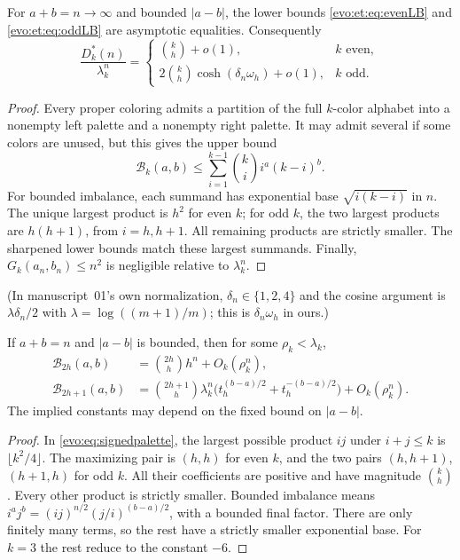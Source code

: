 \documentclass[11pt,a4paper]{article}
\numberwithin{equation}{section}
\theoremstyle{definition}
\theoremstyle{remark}
\newcommand{\Bip}{\mathcal B}
\begin{document}
\begin{lemma}\label{evo:et:lem:witnessasym}
For $a+b=n\to\infty$ and bounded $|a-b|$, the lower bounds
\eqref{evo:et:eq:evenLB} and \eqref{evo:et:eq:oddLB} are asymptotic
equalities. Consequently
\begin{equation}\label{evo:et:eq:witnessasym}
 \frac{D^*_k(n)}{\lambda_k^n}=
 \begin{cases}
 \binom kh+o(1),&k\text{ even},\\
 2\binom kh\cosh(\delta_n\omega_h)+o(1),&k\text{ odd}.
 \end{cases}
\end{equation}
\end{lemma}
\begin{proof}
Every proper coloring admits a partition of the full $k$-color alphabet into a
nonempty left palette and a nonempty right palette. It may admit several if
some colors are unused, but this gives the upper bound
\begin{equation}\label{evo:et:eq:paletteUB}
 \Bip_k(a,b)\le\sum_{i=1}^{k-1}\binom ki i^a(k-i)^b.
\end{equation}
For bounded imbalance, each summand has exponential base $\sqrt{i(k-i)}$ in
$n$. The unique largest product is $h^2$ for even $k$; for odd $k$, the two
largest products are $h(h+1)$, from $i=h,h+1$. All remaining products are
strictly smaller. The sharpened lower bounds match these largest summands.
Finally, $G_k(a_n,b_n)\le n^2$ is negligible relative to $\lambda_k^n$.
\end{proof}

(In manuscript~01's own normalization, $\delta_n\in\{1,2,4\}$ and the cosine
argument is $\lambda\delta_n/2$ with $\lambda=\log((m+1)/m)$; this is
$\delta_n\omega_h$ in ours.)

\begin{lemma}\label{evo:da:lem:balancedasymp}
If $a+b=n$ and $|a-b|$ is bounded, then for some $\rho_k<\lambda_k$,
\begin{align}
\Bip_{2h}(a,b)&=\binom{2h}{h}h^n+O_k(\rho_k^n),\label{evo:da:eq:evenwitnessasymp}\\
\Bip_{2h+1}(a,b)&=\binom{2h+1}{h}\lambda_k^n
 \bigl(t_h^{(b-a)/2}+t_h^{-(b-a)/2}\bigr)+O_k(\rho_k^n).
\label{evo:da:eq:oddwitnessasymp}
\end{align}
The implied constants may depend on the fixed bound on $|a-b|$.
\end{lemma}
\begin{proof}
In \eqref{evo:eq:signedpalette}, the largest possible product $ij$ under
$i+j\le k$ is $\lfloor k^2/4\rfloor$. The maximizing pair is $(h,h)$ for even
$k$, and the two pairs $(h,h+1)$, $(h+1,h)$ for odd $k$. All their
coefficients are positive and have magnitude $\binom kh$. Every other product
is strictly smaller. Bounded imbalance means
$i^aj^b=(ij)^{n/2}(j/i)^{(b-a)/2}$, with a bounded final factor. There are
only finitely many terms, so the rest have a strictly smaller exponential
base. For $k=3$ the rest reduce to the constant $-6$.
\end{proof}
\end{document}

